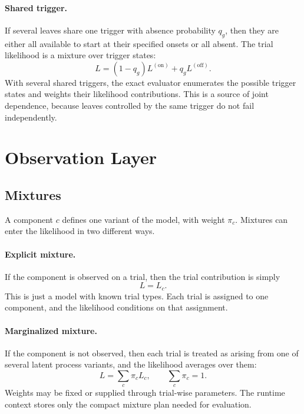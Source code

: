 \documentclass[11pt]{article}
\begin{document}
\paragraph{Shared trigger.}
If several leaves share one trigger with absence probability $q_g$, then they
are either all available to start at their specified onsets or all absent.
The trial likelihood is a
mixture over trigger states:
\begin{equation}
L = (1-q_g)L^{(\mathrm{on})} + q_g L^{(\mathrm{off})}.
\label{eq:shared-trigger}
\end{equation}
With several shared triggers, the exact evaluator enumerates the possible
trigger states and weights their likelihood contributions. This is a source of
joint dependence, because leaves controlled by the same trigger do not fail
independently.

\section{Observation Layer}

\subsection{Mixtures}

A component $c$ defines one variant of the model, with weight $\pi_c$.
Mixtures can enter the likelihood in two different ways.

\paragraph{Explicit mixture.}
If the component is observed on a trial, then the trial contribution is simply
\[
L = L_c.
\]
This is just a model with known trial types. Each trial is assigned to one
component, and the likelihood conditions on that assignment.

\paragraph{Marginalized mixture.}
If the component is not observed, then each trial is treated as arising from
one of several latent process variants, and the likelihood averages over them:
\begin{equation}
L = \sum_c \pi_c L_c,
\qquad
\sum_c \pi_c = 1.
\label{eq:mixture}
\end{equation}
Weights may be fixed or supplied through trial-wise parameters. The runtime
context stores only the compact mixture plan needed for evaluation.
\end{document}
